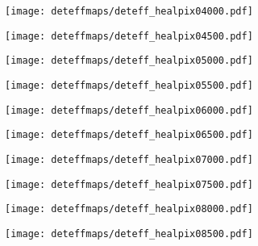 \begin{figure}[H]
	\ContinuedFloat
	\centering
	\begin{subfigure}[t]{0.495\textwidth}
		\texttt{[image: deteffmaps/deteff\_healpix04000.pdf]}
		\subcaption{}
	\end{subfigure}
	\hfill
	\begin{subfigure}[t]{0.495\textwidth}
		\texttt{[image: deteffmaps/deteff\_healpix04500.pdf]}
		\subcaption{}
	\end{subfigure}
	\hfill
	\begin{subfigure}[t]{0.495\textwidth}
		\texttt{[image: deteffmaps/deteff\_healpix05000.pdf]}
		\subcaption{}
	\end{subfigure}
	\hfill
	\begin{subfigure}[t]{0.495\textwidth}
		\texttt{[image: deteffmaps/deteff\_healpix05500.pdf]}
		\subcaption{}
	\end{subfigure}
	\hfill
	\begin{subfigure}[t]{0.495\textwidth}
		\texttt{[image: deteffmaps/deteff\_healpix06000.pdf]}
		\subcaption{}
	\end{subfigure}
	\hfill
	\begin{subfigure}[t]{0.495\textwidth}
		\texttt{[image: deteffmaps/deteff\_healpix06500.pdf]}
		\subcaption{}
	\end{subfigure}
	\hfill
	\begin{subfigure}[t]{0.495\textwidth}
		\texttt{[image: deteffmaps/deteff\_healpix07000.pdf]}
		\subcaption{}
	\end{subfigure}
	\hfill
	\begin{subfigure}[t]{0.495\textwidth}
		\texttt{[image: deteffmaps/deteff\_healpix07500.pdf]}
		\subcaption{}
	\end{subfigure}
	\hfill
	\begin{subfigure}[t]{0.495\textwidth}
		\texttt{[image: deteffmaps/deteff\_healpix08000.pdf]}
		\subcaption{}
	\end{subfigure}
	\hfill
	\begin{subfigure}[t]{0.495\textwidth}
		\texttt{[image: deteffmaps/deteff\_healpix08500.pdf]}
		\subcaption{}
	\end{subfigure}
\end{figure}

